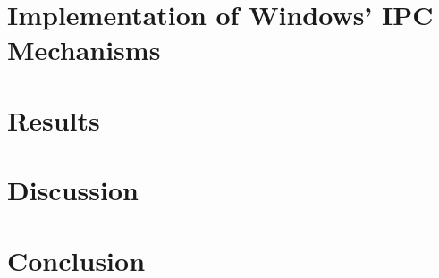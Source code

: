 \documentclass[12pt] {newrucsthesis}    %
\begin{document}
  \chapter{Implementation of Windows' IPC Mechanisms}

  \chapter{Results}

  \chapter{Discussion}

  \chapter{Conclusion}


\end{document}
